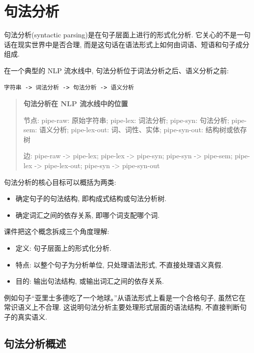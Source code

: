 
\chapter{句法分析}


句法分析(syntactic parsing)是在句子层面上进行的形式化分析.
它关心的不是一句话在现实世界中是否合理, 而是这句话在语法形式上如何由词语、短语和句子成分组成.

在一个典型的 NLP 流水线中, 句法分析位于词法分析之后、语义分析之前:

\begin{Verbatim}[breaklines=true,breakanywhere=true,fontsize=\small]
字符串 -> 词法分析 -> 句法分析 -> 语义分析
\end{Verbatim}

\begin{quote}
\small
\textbf{句法分析在 NLP 流水线中的位置}
\par 节点: pipe-raw: 原始字符串; pipe-lex: 词法分析; pipe-syn: 句法分析; pipe-sem: 语义分析; pipe-lex-out: 词、词性、实体; pipe-syn-out: 结构树或依存树
\par 边: pipe-raw -\textgreater{} pipe-lex; pipe-lex -\textgreater{} pipe-syn; pipe-syn -\textgreater{} pipe-sem; pipe-lex -\textgreater{} pipe-lex-out; pipe-syn -\textgreater{} pipe-syn-out
\end{quote}

句法分析的核心目标可以概括为两类:

\begin{itemize}
\item 确定句子的句法结构, 即构成式结构或句法分析树.
\item 确定词汇之间的依存关系, 即哪个词支配哪个词.
\end{itemize}

课件把这个概念拆成三个角度理解:

\begin{itemize}
\item 定义: 句子层面上的形式化分析.
\item 特点: 以整个句子为分析单位, 只处理语法形式, 不直接处理语义真假.
\item 目的: 输出句法结构, 或输出词汇之间的依存关系.
\end{itemize}

例如句子“亚里士多德吃了一个地球。”从语法形式上看是一个合格句子,
虽然它在常识语义上不合理.
这说明句法分析主要处理形式层面的语法结构, 不直接判断句子的真实语义.

\section{句法分析概述}


